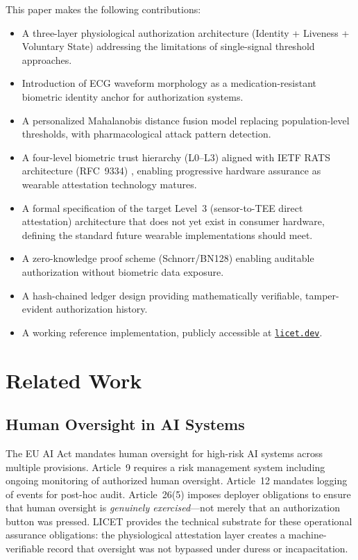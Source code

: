 \documentclass[12pt,a4paper]{article}
\begin{document}
This paper makes the following contributions:
\begin{itemize}
  \item A three-layer physiological authorization architecture (Identity +
  Liveness + Voluntary State) addressing the limitations of single-signal
  threshold approaches.
  \item Introduction of ECG waveform morphology as a medication-resistant
  biometric identity anchor for authorization systems.
  \item A personalized Mahalanobis distance fusion model replacing
  population-level thresholds, with pharmacological attack pattern detection.
  \item A four-level biometric trust hierarchy (L0--L3) aligned with IETF RATS
  architecture (RFC~9334) \cite{rfc9334}, enabling progressive hardware
  assurance as wearable attestation technology matures.
  \item A formal specification of the target Level~3 (sensor-to-TEE direct
  attestation) architecture that does not yet exist in consumer hardware,
  defining the standard future wearable implementations should meet.
  \item A zero-knowledge proof scheme (Schnorr/BN128) enabling auditable
  authorization without biometric data exposure.
  \item A hash-chained ledger design providing mathematically verifiable,
  tamper-evident authorization history.
  \item A working reference implementation, publicly accessible at
  \href{https://licet.dev}{\texttt{licet.dev}}.
\end{itemize}

\section{Related Work}

\subsection{Human Oversight in AI Systems}

The EU AI Act \cite{euaiact2024} mandates human oversight for high-risk AI
systems across multiple provisions. Article~9 requires a risk management
system including ongoing monitoring of authorized human oversight.
Article~12 mandates logging of events for post-hoc audit. Article~26(5)
imposes deployer obligations to ensure that human oversight is \emph{genuinely
exercised}---not merely that an authorization button was pressed. LICET
provides the technical substrate for these operational assurance obligations:
the physiological attestation layer creates a machine-verifiable record that
oversight was not bypassed under duress or incapacitation.
\end{document}
